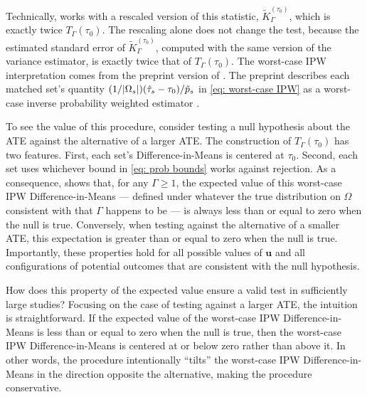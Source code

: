 \documentclass[
  12pt,
  leqno]{article}
\DeclarePairedDelimiter\abs{\lvert}{\rvert}
\begin{document}
Technically, \citet[Section 4.1]{fogarty2023} works with a rescaled
version of this statistic, \(\tilde{K}_{\Gamma}^{(\tau_0)}\), which is
exactly twice \(T_{\Gamma}(\tau_0)\). The rescaling alone does not
change the test, because the estimated standard error of
\(\tilde{K}_{\Gamma}^{(\tau_0)}\), computed with the same version of the
variance estimator, is exactly twice that of \(T_{\Gamma}(\tau_0)\). The
worst-case IPW interpretation comes from the preprint version of
\citet{fogarty2023}. The preprint describes each matched set's quantity
\((1/\abs{\Omega_s})(\hat{\tau}_s - \tau_0)/\tilde{p}_s\) in
\eqref{eq: worst-case IPW} as a worst-case inverse probability weighted
estimator \citep[Sections 5.2--5.4]{fogarty2020arxiv}.

To see the value of this procedure, consider testing a null hypothesis
about the ATE against the alternative of a larger ATE. The construction
of \(T_{\Gamma}(\tau_0)\) has two features. First, each set's
Difference-in-Means is centered at \(\tau_0\). Second, each set uses
whichever bound in \eqref{eq: prob bounds} works against rejection. As a
consequence, \citet[Section 4.1 and Lemma 3]{fogarty2023} shows that,
for any \(\Gamma \geq 1\), the expected value of this worst-case IPW
Difference-in-Means --- defined under whatever the true distribution on
\(\Omega\) consistent with that \(\Gamma\) happens to be --- is always
less than or equal to zero when the null is true. Conversely, when
testing against the alternative of a smaller ATE, this expectation is
greater than or equal to zero when the null is true. Importantly, these
properties hold for all possible values of \(\bm{u}\) and all
configurations of potential outcomes that are consistent with the null
hypothesis.

How does this property of the expected value ensure a valid test in
sufficiently large studies? Focusing on the case of testing against a
larger ATE, the intuition is straightforward. If the expected value of
the worst-case IPW Difference-in-Means is less than or equal to zero
when the null is true, then the worst-case IPW Difference-in-Means is
centered at or below zero rather than above it. In other words, the
procedure intentionally ``tilts'' the worst-case IPW Difference-in-Means
in the direction opposite the alternative, making the procedure
conservative.
\end{document}
